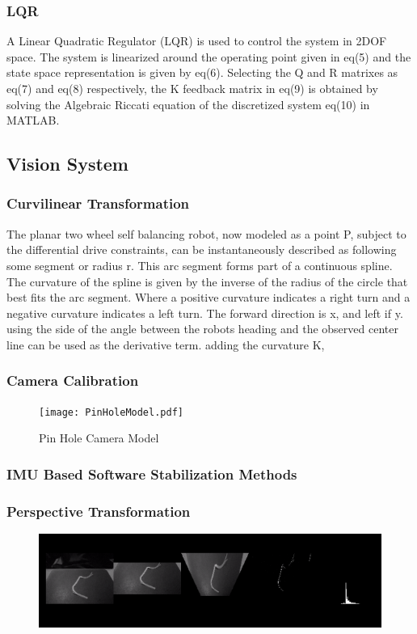         \subsubsection{LQR}
        A Linear Quadratic Regulator (LQR) is used to control the system in 2DOF space.
        The system is linearized around the operating point given in eq(5) 
        and the state space representation is given by eq(6).
        Selecting the Q and R matrixes as eq(7) and eq(8) respectively, 
        the K feedback matrix in eq(9) is obtained by solving the Algebraic Riccati
        equation of the discretized system eq(10) in MATLAB.

         

    \subsection{Vision System}
        \subsubsection{Curvilinear Transformation}
        The planar two wheel self balancing robot, now modeled as a point P, subject to the differential drive constraints, 
        can be instantaneously described as following some segment or radius r. This arc segment forms part of a continuous spline. 
        The curvature of the spline is given by the inverse of the radius of the circle that best fits the arc segment.
        Where a positive curvature indicates a right turn and a negative curvature indicates a left turn.
        The forward direction is x, and left if y. using the side of the angle between the robots heading and the observed center line can be used as the derivative term.
        adding the curvature K, 
            \subsubsection{Camera Calibration}
            \begin{figure}
            \texttt{[image: PinHoleModel.pdf]}
            \caption{Pin Hole Camera Model}
            \end{figure}

            \subsubsection{IMU Based Software Stabilization Methods}
            \subsubsection{Perspective Transformation}
            \begin{figure}
            \includegraphics[width=\textwidth]{VisionPipelineRes.png}
            \end{figure}
